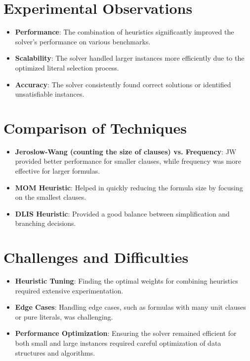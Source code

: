 \documentclass[titlepage]{article}
\begin{document}
\section*{Experimental Observations}
\begin{itemize}
    \item \textbf{Performance}: The combination of heuristics significantly improved the solver's performance on various benchmarks.
    \item \textbf{Scalability}: The solver handled larger instances more efficiently due to the optimized literal selection process.
    \item \textbf{Accuracy}: The solver consistently found correct solutions or identified unsatisfiable instances.
\end{itemize}

\section*{Comparison of Techniques}
\begin{itemize}
    \item \textbf{Jeroslow-Wang (counting the size of clauses) vs. Frequency}: JW provided better performance for smaller clauses, while frequency was more effective for larger formulas.
    \item \textbf{MOM Heuristic}: Helped in quickly reducing the formula size by focusing on the smallest clauses.
    \item \textbf{DLIS Heuristic}: Provided a good balance between simplification and branching decisions.
\end{itemize}

\section*{Challenges and Difficulties}
\begin{itemize}
    \item \textbf{Heuristic Tuning}: Finding the optimal weights for combining heuristics required extensive experimentation.
    \item \textbf{Edge Cases}: Handling edge cases, such as formulas with many unit clauses or pure literals, was challenging.
    \item \textbf{Performance Optimization}: Ensuring the solver remained efficient for both small and large instances required careful optimization of data structures and algorithms.
\end{itemize}
\end{document}

